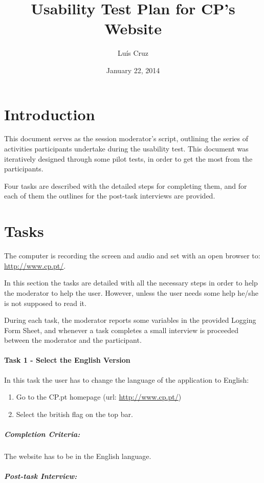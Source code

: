 \documentclass[a4paper]{article}
\title{Usability Test Plan for CP's Website}
\author[1]{Luís  Cruz}
\affil[1]{MAP-i\\ Joint Doctoral Programme in Computer Science}
\date{January 22, 2014}
\begin{document}
\maketitle

\section{Introduction}

This document serves as the session moderator's script, outlining the series of activities participants undertake during the usability test. This document was iteratively designed through some pilot tests, in order to get the most from the participants.

Four tasks are described with the detailed steps for completing them, and for each of them the outlines for the post-task interviews are provided. 
 
\section{Tasks}

The computer is recording the screen and audio and set with an open browser to: \url{http://www.cp.pt/}.

In this section the tasks are detailed with all the necessary steps in order to help the moderator to help the user. However, unless the user needs some help he/she is not supposed to read it.

During each task, the moderator reports some variables in the provided Logging Form Sheet, and whenever a task completes a small interview is proceeded between the moderator and the participant.

\paragraph{Task 1 - Select the English Version} In this task the user has to change the language of the application to English:

\begin{enumerate}[label=\roman*.]
  \item Go to the CP.pt homepage (url: \url{http://www.cp.pt/}) 
  \item Select the british flag on the top bar.
\end{enumerate}
\subparagraph{Completion Criteria:} The website has to be in the English language.

\subparagraph{Post-task Interview:}
\end{document}
